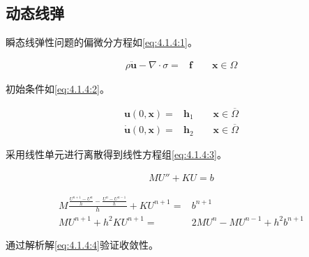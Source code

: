 \subsection{动态线弹}

瞬态线弹性问题的偏微分方程如\eqref{eq:4.1.4:1}。

\begin{align}\label{eq:4.1.4:1}
  \rho\ddot{\mathbf u}-\nabla\cdot\sigma=& \mathbf f \qquad \mathbf x\in\Omega
\end{align}

初始条件如\eqref{eq:4.1.4:2}。 
	
\begin{equation}\label{eq:4.1.4:2}
  \begin{split}
    \mathbf u(0,\mathbf x) = & \mathbf h_1 \qquad \mathbf x\in\overline\Omega\\
    \dot{\mathbf u}(0,\mathbf x) = & \mathbf h_2 \qquad \mathbf x\in\overline\Omega
  \end{split}
\end{equation}

采用线性单元进行离散得到线性方程组\eqref{eq:4.1.4:3}。

\begin{align}\label{eq:4.1.4:3}
   M U'' + KU = b
\end{align}

\begin{align*}
  M\frac{\frac{U^{n+1}-U^{n}}{h}-\frac{U^{n}-U^{n-1}}{h}}{h} + KU^{n+1} =& b^{n+1}\\
  MU^{n+1} + h^2KU^{n+1} =& 2MU^{n} - MU^{n-1} + h^2b^{n+1}
\end{align*}

通过解析解\eqref{eq:4.1.4:4}验证收敛性。


